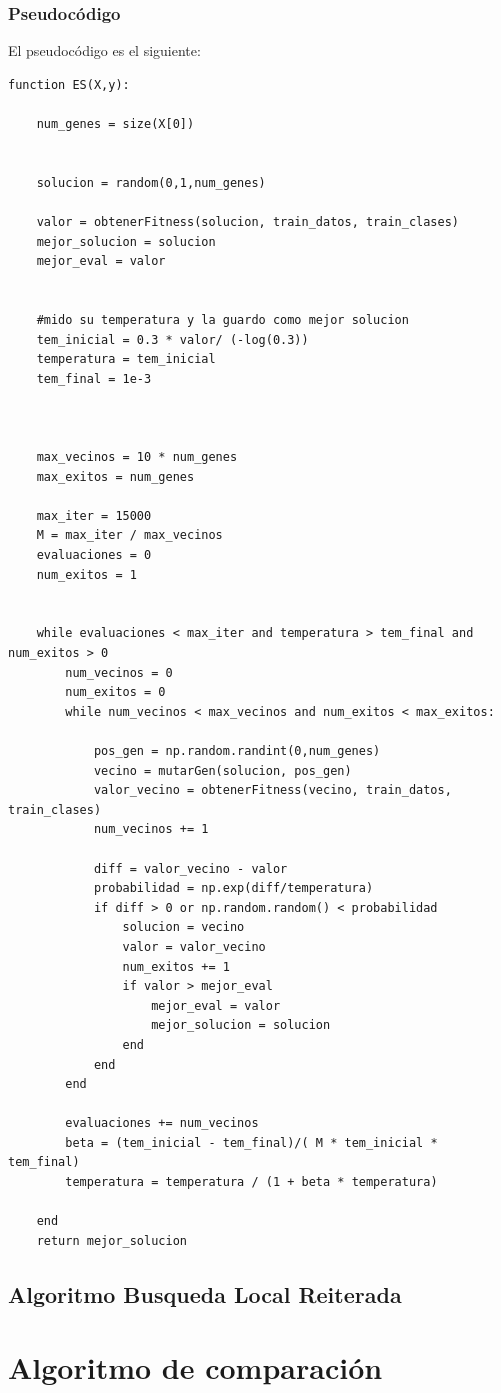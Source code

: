 \documentclass[titlepage]{article}
\begin{document}
	\subsubsection{Pseudocódigo}
	El pseudocódigo es el siguiente:
	\begin{lstlisting}
function ES(X,y):
	
	num_genes = size(X[0])
	
	
	solucion = random(0,1,num_genes)   
	
	valor = obtenerFitness(solucion, train_datos, train_clases)
	mejor_solucion = solucion
	mejor_eval = valor
	
	
	#mido su temperatura y la guardo como mejor solucion    
	tem_inicial = 0.3 * valor/ (-log(0.3))
	temperatura = tem_inicial
	tem_final = 1e-3
	
	
	
	max_vecinos = 10 * num_genes
	max_exitos = num_genes
	
	max_iter = 15000
	M = max_iter / max_vecinos
	evaluaciones = 0
	num_exitos = 1
	
	
	while evaluaciones < max_iter and temperatura > tem_final and num_exitos > 0
		num_vecinos = 0
		num_exitos = 0
		while num_vecinos < max_vecinos and num_exitos < max_exitos:
		
			pos_gen = np.random.randint(0,num_genes)
			vecino = mutarGen(solucion, pos_gen)
			valor_vecino = obtenerFitness(vecino, train_datos, train_clases)
			num_vecinos += 1
			
			diff = valor_vecino - valor 
			probabilidad = np.exp(diff/temperatura)
			if diff > 0 or np.random.random() < probabilidad
				solucion = vecino
				valor = valor_vecino
				num_exitos += 1
				if valor > mejor_eval
					mejor_eval = valor
					mejor_solucion = solucion
				end
			end
		end
		
		evaluaciones += num_vecinos 
		beta = (tem_inicial - tem_final)/( M * tem_inicial * tem_final)
		temperatura = temperatura / (1 + beta * temperatura)

	end
	return mejor_solucion   

	\end{lstlisting}
	\newpage
	\subsection{Algoritmo Busqueda Local Reiterada}
	\section{Algoritmo de comparación}
\end{document}
